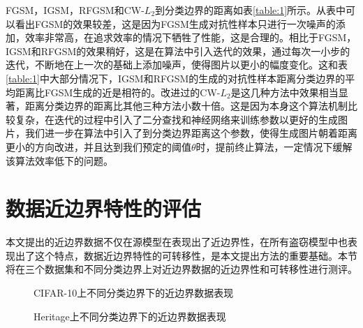 FGSM，IGSM，RFGSM和CW-$L_2$到分类边界的距离如表\ref{table:1}所示。从表中可以看出FGSM的效果较差，这是因为FGSM生成对抗性样本只进行一次噪声的添加，效率非常高，在追求效率的情况下牺牲了性能，这是合理的。相比于FGSM，IGSM和RFGSM的效果稍好，这是在算法中引入迭代的效果，通过每次一小步的迭代，不断地在上一次的基础上添加噪声，使得图片以更小的幅度变化。这和表\ref{table:1}中大部分情况下，IGSM和RFGSM的生成的对抗性样本距离分类边界的平均距离比FGSM生成的近是相符的。改进过的CW-$L_2$是这几种方法中效果相当显著，距离分类边界的距离比其他三种方法小数十倍。这是因为本身这个算法机制比较复杂，在迭代的过程中引入了二分查找和神经网络来训练参数以更好的生成图片，我们进一步在算法中引入了到分类边界距离这个参数，使得生成图片朝着距离更小的方向改进，并且达到我们预定的阈值$\theta$时，提前终止算法，一定情况下缓解该算法效率低下的问题。


\section{数据近边界特性的评估}\label{5.3}

本文提出的近边界数据不仅在源模型在表现出了近边界性，在所有盗窃模型中也表现出了这个特点，数据近边界特性的可转移性，是本文提出方法的重要基础。本节将在三个数据集和不同分类边界上对近边界数据的近边界性和可转移性进行测评。

\begin{figure}[!htb]
	\centering
	\caption{CIFAR-10上不同分类边界下的近边界数据表现}
	\label{CIFAR-10上不同分类边界下的近边界数据表现}
    \setlength{\abovecaptionskip}{7mm}
\end{figure}

\begin{figure}[!htb]
	\centering
	\caption{Heritage上不同分类边界下的近边界数据表现}
	\label{Heritage上不同分类边界下的近边界数据表现}
	\setlength{\abovecaptionskip}{7mm}
\end{figure}

